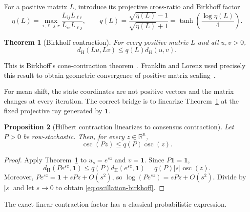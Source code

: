 \documentclass[11pt]{article}
\newtheorem{theorem}{Theorem}[section]
\newtheorem{proposition}[theorem]{Proposition}
\theoremstyle{definition}
\newcommand{\R}{\mathbb{R}}
\newcommand{\one}{\mathbf{1}}
\newcommand{\osc}{\operatorname{osc}}
\newcommand{\dH}{d_{\mathrm H}}
\begin{document}
For a positive matrix $L$, introduce its projective cross-ratio and Birkhoff
factor
\begin{equation}\label{eq:birkhoff-factor}
  \eta(L)
  =
  \max_{i,\ell,j,r}
  \frac{L_{ij}L_{\ell r}}{L_{ir}L_{\ell j}},
  \qquad
  q(L)
  =
  \frac{\sqrt{\eta(L)}-1}{\sqrt{\eta(L)}+1}
  =
  \tanh\!\left(\frac{\log\eta(L)}{4}\right).
\end{equation}

\begin{theorem}[Birkhoff contraction]\label{thm:birkhoff}
For every positive matrix $L$ and all $u,v>0$,
\begin{equation}\label{eq:birkhoff-contraction}
  \dH(Lu,Lv)
  \leq
  q(L)\dH(u,v).
\end{equation}
\end{theorem}

This is Birkhoff's cone-contraction theorem~\cite{Birkhoff1957}.  Franklin and
Lorenz used precisely this result to obtain geometric convergence of positive
matrix scaling~\cite{FranklinLorenz1989}.

For mean shift, the state coordinates are not positive vectors and the matrix
changes at every iteration.  The correct bridge is to linearize
Theorem~\ref{thm:birkhoff} at the fixed projective ray generated by $\one$.

\begin{proposition}[Hilbert contraction linearizes to consensus contraction]
\label{prop:hilbert-to-oscillation}
Let $P>0$ be row-stochastic.  Then, for every $z\in\R^n$,
\begin{equation}\label{eq:oscillation-birkhoff}
  \osc(Pz)
  \leq
  q(P)\osc(z).
\end{equation}
\end{proposition}

\begin{proof}
Apply Theorem~\ref{thm:birkhoff} to $u_s=e^{sz}$ and $v=\one$.  Since
$P\one=\one$,
\begin{equation*}
  \dH(Pe^{sz},\one)
  \leq
  q(P)\dH(e^{sz},\one)
  =
  q(P)|s|\osc(z).
\end{equation*}
Moreover,
$Pe^{sz}=\one+sPz+O(s^2)$, so
$\log(Pe^{sz})=sPz+O(s^2)$.  Divide by $|s|$ and let $s\to0$ to obtain
\eqref{eq:oscillation-birkhoff}.
\end{proof}

The exact linear contraction factor has a classical probabilistic expression.
\end{document}
